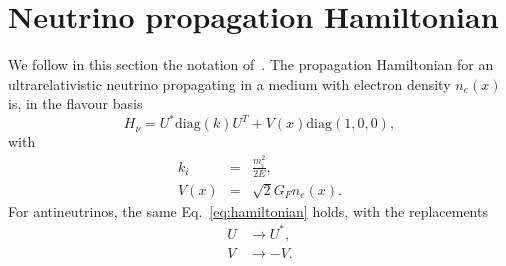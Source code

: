 \documentclass[11pt,a4paper]{article}
\newcommand{\de}[0]{\text{d}}
\begin{document}
%

\section{Neutrino propagation Hamiltonian}
We follow in this section the notation of~\cite{Fantini:2018itu}.
The propagation Hamiltonian for an ultrarelativistic neutrino propagating in a medium with electron density $n_e(x)$ is, in the flavour basis
\begin{equation}\label{eq:hamiltonian}
	H_\nu = U^* \text{diag}(k) U^T + V(x) \text{diag}(1,0,0),
\end{equation}
with
\begin{eqnarray}
	k_i &=& \frac{m_i^2}{2E},\\
	V(x) &=& \sqrt{2}G_F n_e(x).
\end{eqnarray}
For antineutrinos, the same Eq.~\ref{eq:hamiltonian} holds, with the replacements
\begin{eqnarray}
	U &\rightarrow U^*,\\
	V &\rightarrow -V.
\end{eqnarray}
\end{document}
